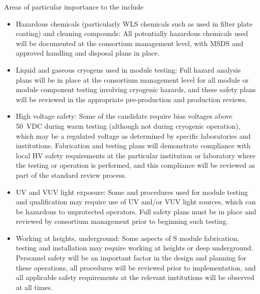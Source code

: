 Areas of particular importance to the  include
\begin{itemize}
\item Hazardous chemicals (particularly WLS chemicals such as  used in filter plate coating) and cleaning compounds:  All potentially hazardous chemicals used will be documented at the consortium management level, with MSDS and approved handling and disposal plans in place.

\item Liquid and gaseous cryogens used in module testing:  Full hazard analysis plans will be in place at the consortium management level for all module or module component testing involving cryogenic hazards, and these safety plans will be reviewed in the appropriate pre-production and production reviews.

\item High voltage safety:  Some of the candidate  require bias voltages above \SI{50}{VDC} during warm testing (although not during cryogenic operation), which may be a regulated voltage as determined by specific laboratories and institutions.  Fabrication and testing plans will demonstrate compliance with local HV safety requirements at the particular institution or laboratory where the testing or operation is performed, and this compliance will be reviewed as part of the standard review process.

\item UV and VUV light exposure:  Some  and  procedures used for module testing and qualification may require use of UV and/or VUV light sources, which can be hazardous  to unprotected operators.  Full safety plans must be in place and reviewed by consortium management prior to beginning such testing.

\item Working at heights, underground:  Some aspects of S module fabrication, testing and installation may require working at heights or deep underground. Personnel safety will be an important factor in the design and planning for these operations, all procedures will be reviewed prior to implementation, and all applicable safety requirements at the relevant institutions will be observed at all times.
%

\end{itemize}
